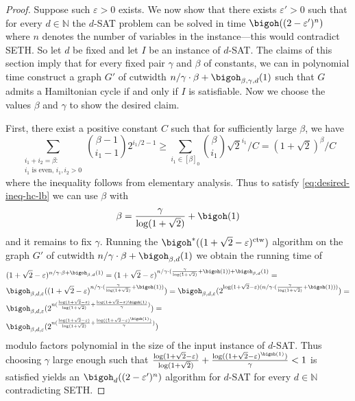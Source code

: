 \documentclass[a4paper,UKenglish,cleveref, autoref, thm-restate]{lipics-v2021}
\begin{document}
\begin{proof}
	Suppose such $\varepsilon > 0$ exists.
	We now show that there exists $\varepsilon' > 0$ such that for every $d \in \mathbb{N}$ the $d$-\textsc{SAT} problem can be solved in time $\bigoh((2-\varepsilon')^{n})$ where $n$ denotes the number of variables in the instance---this would contradict SETH.
	So let $d$ be fixed and let $I$ be an instance of $d$-SAT.
	The claims of this section imply that for every fixed pair $\gamma$ and $\beta$ of constants, we can in polynomial time construct a graph $G'$ of cutwidth $n / \gamma \cdot \beta + \bigoh_{\beta, \gamma, d}(1)$ such that $G$ admits a Hamiltonian cycle if and only if $I$ is satisfiable.
	Now we choose the values $\beta$ and $\gamma$ to show the desired claim.
	
	First, there exist a positive constant $C$ such that for sufficiently large $\beta$, we have
	\[
		\sum_{\substack{i_1 + i_2 = \beta \colon \\ i_1 \text{ is even, } i_1, i_2 > 0}} {\beta - 1 \choose i_1 - 1} 2^{i_1/2 - 1} \geq \sum_{i_1 \in [\beta]_0} {\beta \choose i_1} \sqrt{2}^{i_1}/C = (1+\sqrt{2})^\beta / C 
	\]
	where the inequality follows from elementary analysis.
	Thus to satisfy \eqref{eq:desired-ineq-hc-lb} we can use $\beta$ with 
	\[
		\beta = \frac{\gamma}{\log(1+\sqrt{2})} + \bigoh(1)
	\]
	and it remains to fix $\gamma$.
	Running the $\bigoh^*((1+\sqrt{2}-\varepsilon)^{\operatorname{ctw}})$ algorithm on the graph $G'$ of cutwidth $n/\gamma \cdot \beta + \bigoh_{\beta,d}(1)$ we obtain the running time of
	\begin{align*}
		&(1+\sqrt{2}-\varepsilon)^{n/\gamma \cdot \beta + \bigoh_{\beta,d}(1)} = (1+\sqrt{2}-\varepsilon)^{n/\gamma \cdot (\frac{\gamma}{\log(1+\sqrt{2})} + \bigoh(1)) + \bigoh_{\beta,d}(1)} = \\
		&\bigoh_{\beta,d,\varepsilon} ((1+\sqrt{2}-\varepsilon)^{n/\gamma \cdot (\frac{\gamma}{\log(1+\sqrt{2})} + \bigoh(1))}) = 
		\bigoh_{\beta,d,\varepsilon} (2^{\log (1+\sqrt{2}-\varepsilon) (n/\gamma \cdot (\frac{\gamma}{\log(1+\sqrt{2})} + \bigoh(1)))}) = \\
		&\bigoh_{\beta,d,\varepsilon} (2^{n(\frac{\log (1+\sqrt{2}-\varepsilon)}{\log(1+\sqrt{2})} + \frac{\log (1+\sqrt{2}-\varepsilon) \bigoh(1)}{\gamma})}) = \\
		&\bigoh_{\beta,d,\varepsilon} (2^{n(\frac{\log (1+\sqrt{2}-\varepsilon)}{\log(1+\sqrt{2})} + \frac{\log ((1+\sqrt{2}-\varepsilon)^{\bigoh(1)})}{\gamma})})
	\end{align*} 
	modulo factors polynomial in the size of the input instance of $d$-\textsc{SAT}.
	Thus choosing $\gamma$ large enough such that $\frac{\log (1+\sqrt{2}-\varepsilon)}{\log(1+\sqrt{2})} + \frac{\log ((1+\sqrt{2}-\varepsilon)^{\bigoh(1)})}{\gamma} < 1$ is satisfied yields an $\bigoh_d((2 - \varepsilon')^n)$ algorithm for $d$-SAT for every $d \in \mathbb{N}$ contradicting SETH.	
\end{proof}
\end{document}
